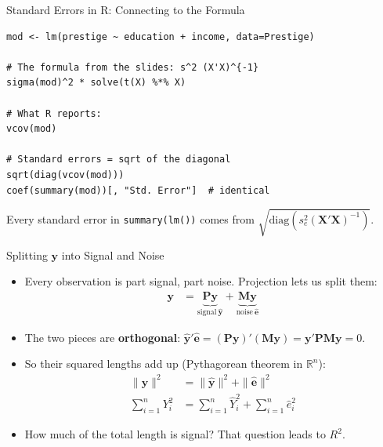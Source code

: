 \documentclass[aspectratio=169, handout]{beamer}
\numberwithin{equation}{section}
\begin{document}
\begin{frame}[fragile]{Standard Errors in R: Connecting to the Formula}
\begin{lstlisting}
mod <- lm(prestige ~ education + income, data=Prestige)

# The formula from the slides: s^2 (X'X)^{-1}
sigma(mod)^2 * solve(t(X) %*% X)

# What R reports:
vcov(mod)

# Standard errors = sqrt of the diagonal
sqrt(diag(vcov(mod)))
coef(summary(mod))[, "Std. Error"]  # identical
\end{lstlisting}
\vspace{1ex}
Every standard error in \texttt{summary(lm())} comes from $\sqrt{\text{diag}(s^2_e(\bm{X'X})^{-1})}$.
\end{frame}


\begin{frame}{Splitting $\bm{y}$ into Signal and Noise}
\begin{itemize}\itemsep=2pt
\item Every observation is part signal, part noise. Projection lets us split them:
\vspace{-0.3em}
\begin{align*}
\bm{y}&=\underbrace{\bm{Py}}_{\text{signal}\ \bm{\hat{y}}}+\underbrace{\bm{My}}_{\text{noise}\ \bm{\hat{e}}}
\end{align*}\pause
\vspace{-0.5em}
\item The two pieces are \textbf{orthogonal}: $\bm{\hat{y}}'\bm{\hat{e}}=(\bm{Py})'(\bm{My})=\bm{y}'\bm{PMy}=0$.\pause
\item So their squared lengths add up (Pythagorean theorem in $\mathbb{R}^n$):
\vspace{-0.3em}
\begin{align*}
\|\bm{y}\|^2&=\|\bm{\hat{y}}\|^2+\|\bm{\hat{e}}\|^2\\[-2pt]
\sum_{i=1}^n Y_i^2&= \sum_{i=1}^n \hat{Y}_i^2+\sum_{i=1}^n \hat{e}_i^2
\end{align*}
\vspace{-0.5em}
\item How much of the total length is signal? That question leads to $R^2$.
\end{itemize}
\end{frame}
\end{document}
